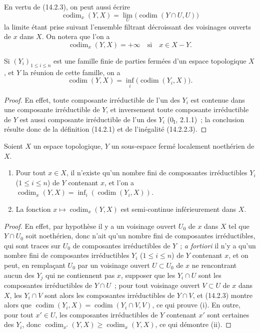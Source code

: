 En vertu de (14.2.3), on peut aussi écrire
\[
  \operatorname{codim}_x(Y,X)=
  \lim_U\bigl(\operatorname{codim}(Y\cap U,U)\bigr)
  \tag{14.2.4.1}\label{0.14.2.4.1-fr}
\]
la limite étant prise suivant l'ensemble filtrant décroissant des voisinages
ouverts de $x$ dans $X$. On notera que l'on a
\[
  \operatorname{codim}_x(Y,X)=+\infty\quad\text{si}\quad x\in X-Y.
\]

\begin{proposition}[14.2.5]
\label{0.14.2.5-fr}
Si $(Y_i)_{1\leq i\leq n}$ est une famille finie de parties fermées d'un
espace topologique $X$, et $Y$ la réunion de cette famille, on a
\[
  \operatorname{codim}(Y,X)=
  \inf_i\bigl(\operatorname{codim}(Y_i,X)\bigr).
  \tag{14.2.5.1}\label{0.14.2.5.1-fr}
\]
\end{proposition}

\begin{proof}
En effet, toute composante irréductible de l'un des $Y_i$ est contenue dans
une composante irréductible de $Y$, et inversement toute composante
irréductible de $Y$ est aussi composante irréductible de l'un des $Y_i$
($0_{\mathrm I}$, 2.1.1)~; la conclusion résulte donc de la définition
(14.2.1) et de l'inégalité (14.2.2.3).
\end{proof}

\begin{corollary}[14.2.6]
\label{0.14.2.6-fr}
Soient $X$ un espace topologique, $Y$ un sous-espace fermé localement
noethérien de $X$.
\begin{enumerate}
  \item[\rm(i)] Pour tout $x\in X$, il n'existe qu'un nombre fini de
  composantes irréductibles $Y_i$ ($1\leq i\leq n$) de $Y$ contenant $x$,
  et l'on a
  $\operatorname{codim}_x(Y,X)=
  \inf_i(\operatorname{codim}(Y_i,X))$.
  \item[\rm(ii)] La fonction
  $x\mapsto\operatorname{codim}_x(Y,X)$ est semi-continue inférieurement
  dans $X$.
\end{enumerate}
\end{corollary}

\begin{proof}
En effet, par hypothèse il y a un voisinage ouvert $U_0$ de $x$ dans $X$ tel
que $Y\cap U_0$ soit noethérien, donc n'ait qu'un nombre fini de composantes
irréductibles, qui sont traces sur $U_0$ de composantes irréductibles de $Y$~;
\emph{a fortiori} il n'y a qu'un nombre fini de composantes irréductibles
$Y_i$ ($1\leq i\leq n$) de $Y$ contenant $x$, et on peut, en remplaçant $U_0$
par un voisinage ouvert $U\subset U_0$ de $x$ ne rencontrant aucun des $Y_j$
qui ne contiennent pas $x$, supposer que les $Y_i\cap U$ sont les composantes
irréductibles de $Y\cap U$~; pour tout voisinage ouvert $V\subset U$ de $x$
dans $X$, les $Y_i\cap V$ sont alors les composantes irréductibles de
$Y\cap V$, et (14.2.3) montre alors que
$\operatorname{codim}(Y_i,X)=\operatorname{codim}(Y_i\cap V,V)$, ce qui
prouve (i). En outre, pour tout $x'\in U$, les composantes irréductibles de
$Y$ contenant $x'$ sont certaines des $Y_i$, donc
$\operatorname{codim}_{x'}(Y,X)\geq\operatorname{codim}_x(Y,X)$, ce qui
démontre (ii).
\end{proof}

